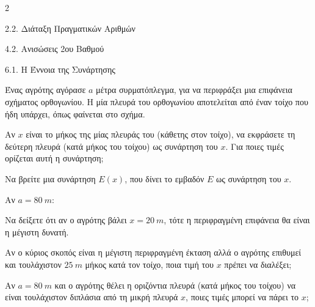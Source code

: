 \begin{ylh}{2}
    \item 2.2. Διάταξη Πραγματικών Αριθμών
    \item 4.2. Ανισώσεις 2ου Βαθμού
    \item 6.1. Η Έννοια της Συνάρτησης
\end{ylh}

Ένας αγρότης αγόρασε $a$ μέτρα συρματόπλεγμα, για να περιφράξει μια επιφάνεια σχήματος ορθογωνίου. Η μία πλευρά του ορθογωνίου αποτελείται από έναν τοίχο που ήδη υπάρχει, όπως φαίνεται στο σχήμα.

\begin{center}
\end{center}

\begin{alist}
\item Αν $x$ είναι το μήκος της μίας πλευράς του (κάθετης στον τοίχο), να εκφράσετε τη δεύτερη πλευρά (κατά μήκος του τοίχου) ως συνάρτηση του $x$. Για ποιες τιμές ορίζεται αυτή η συνάρτηση;
\item Να βρείτε μια συνάρτηση $E(x)$, που δίνει το εμβαδόν $E$ ως συνάρτηση του $x$.
\item Αν $a = 80\ m$:

\begin{rlist}
\item Να δείξετε ότι αν ο αγρότης βάλει $x = 20\ m$, τότε η περιφραγμένη επιφάνεια θα είναι η μέγιστη δυνατή.
\item Αν ο κύριος σκοπός είναι η μέγιστη περιφραγμένη έκταση αλλά ο αγρότης επιθυμεί και τουλάχιστον $25\ m$ μήκος κατά τον τοίχο, ποια τιμή του $x$ πρέπει να διαλέξει;
\end{rlist}
\item Αν $a = 80\ m$ και ο αγρότης θέλει η οριζόντια πλευρά (κατά μήκος του τοίχου) να είναι τουλάχιστον διπλάσια από τη μικρή πλευρά $x$, ποιες τιμές μπορεί να πάρει το $x$;
\end{alist}

